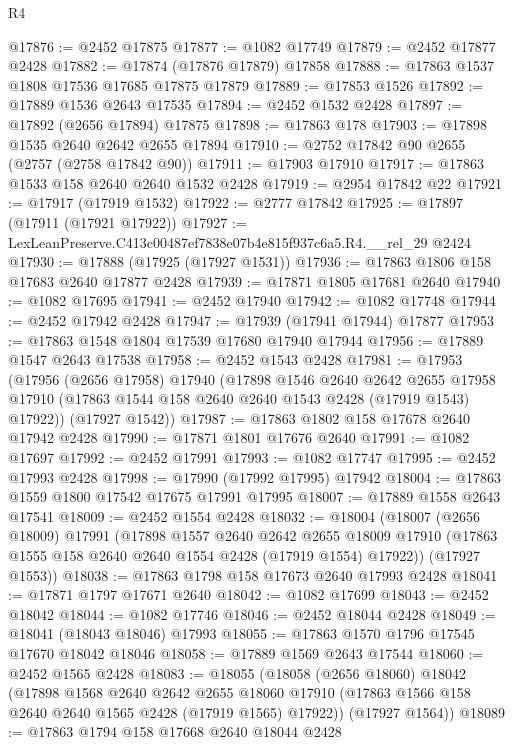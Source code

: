\begin{lexlean}{R4}
\begin{coremodule}
@17876 := @2452 @17875
@17877 := @1082 @17749
@17879 := @2452 @17877 @2428
@17882 := @17874 (@17876 @17879) @17858
@17888 := @17863 @1537 @1808 @17536 @17685 @17875 @17879
@17889 := @17853 @1526
@17892 := @17889 @1536 @2643 @17535
@17894 := @2452 @1532 @2428
@17897 := @17892 (@2656 @17894) @17875
@17898 := @17863 @178
@17903 := @17898 @1535 @2640 @2642 @2655 @17894
@17910 := @2752 @17842 @90 @2655 (@2757 (@2758 @17842 @90))
@17911 := @17903 @17910
@17917 := @17863 @1533 @158 @2640 @2640 @1532 @2428
@17919 := @2954 @17842 @22
@17921 := @17917 (@17919 @1532)
@17922 := @2777 @17842
@17925 := @17897 (@17911 (@17921 @17922))
@17927 := LexLeanPreserve.C413c00487ef7838e07b4e815f937c6a5.R4.__rel_29 @2424
@17930 := @17888 (@17925 (@17927 @1531))
@17936 := @17863 @1806 @158 @17683 @2640 @17877 @2428
@17939 := @17871 @1805 @17681 @2640
@17940 := @1082 @17695
@17941 := @2452 @17940
@17942 := @1082 @17748
@17944 := @2452 @17942 @2428
@17947 := @17939 (@17941 @17944) @17877
@17953 := @17863 @1548 @1804 @17539 @17680 @17940 @17944
@17956 := @17889 @1547 @2643 @17538
@17958 := @2452 @1543 @2428
@17981 := @17953
    (@17956
      (@2656 @17958)
      @17940
      (@17898
        @1546
        @2640
        @2642
        @2655
        @17958
        @17910
        (@17863 @1544 @158 @2640 @2640 @1543 @2428 (@17919 @1543) @17922))
      (@17927 @1542))
@17987 := @17863 @1802 @158 @17678 @2640 @17942 @2428
@17990 := @17871 @1801 @17676 @2640
@17991 := @1082 @17697
@17992 := @2452 @17991
@17993 := @1082 @17747
@17995 := @2452 @17993 @2428
@17998 := @17990 (@17992 @17995) @17942
@18004 := @17863 @1559 @1800 @17542 @17675 @17991 @17995
@18007 := @17889 @1558 @2643 @17541
@18009 := @2452 @1554 @2428
@18032 := @18004
    (@18007
      (@2656 @18009)
      @17991
      (@17898
        @1557
        @2640
        @2642
        @2655
        @18009
        @17910
        (@17863 @1555 @158 @2640 @2640 @1554 @2428 (@17919 @1554) @17922))
      (@17927 @1553))
@18038 := @17863 @1798 @158 @17673 @2640 @17993 @2428
@18041 := @17871 @1797 @17671 @2640
@18042 := @1082 @17699
@18043 := @2452 @18042
@18044 := @1082 @17746
@18046 := @2452 @18044 @2428
@18049 := @18041 (@18043 @18046) @17993
@18055 := @17863 @1570 @1796 @17545 @17670 @18042 @18046
@18058 := @17889 @1569 @2643 @17544
@18060 := @2452 @1565 @2428
@18083 := @18055
    (@18058
      (@2656 @18060)
      @18042
      (@17898
        @1568
        @2640
        @2642
        @2655
        @18060
        @17910
        (@17863 @1566 @158 @2640 @2640 @1565 @2428 (@17919 @1565) @17922))
      (@17927 @1564))
@18089 := @17863 @1794 @158 @17668 @2640 @18044 @2428

\end{coremodule}
\end{lexlean}
